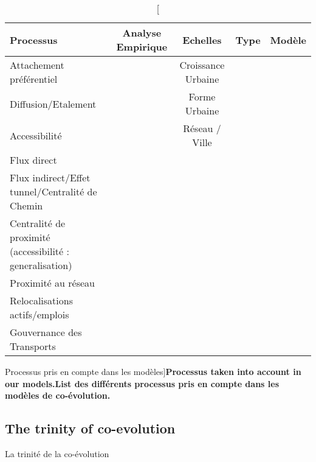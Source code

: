\begin{table}
\begin{tabular}[6pt]{|m{6cm}|c|c|c|c|}
\hline
Processus & Analyse Empirique & Echelles & Type & Modèle \\\hline
Attachement préférentiel & & Croissance Urbaine & & \\\hline
Diffusion/Etalement & & Forme Urbaine & &\\\hline
Accessibilité  & & Réseau / Ville & & \\\hline
Flux direct  & & & &\\\hline
Flux indirect/Effet tunnel/Centralité de Chemin & & & &\\\hline
Centralité de proximité (accessibilité : generalisation) & & & &\\\hline
Proximité au réseau & & & &\\\hline
Relocalisations actifs/emplois & & & &\\\hline
Gouvernance des Transports & & & &\\\hline
\end{tabular}
\caption[Processus taken into account in our models][Processus pris en compte dans les modèles]{\textbf{Processus taken into account in our models.}\label{tab:partIII:modeled}}{\textbf{List des différents processus pris en compte dans les modèles de co-évolution.}\label{tab:partIII:modeled}}
\end{table}








\subsection*{The trinity of co-evolution}{La trinité de la co-évolution}





